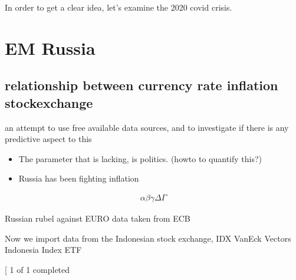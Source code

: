 \documentclass[letterpaper,10pt,english]{sphinxmanual}
\begin{document}
\sphinxAtStartPar
In order to get a clear idea, let’s examine the 2020 covid crisis.


\chapter{EM Russia}
\label{\detokenize{russia:em-russia}}\label{\detokenize{russia::doc}}

\section{relationship between currency rate \sphinxhyphen{} inflation \sphinxhyphen{} stockexchange}
\label{\detokenize{russia:relationship-between-currency-rate-inflation-stockexchange}}
\sphinxAtStartPar
an attempt to use free available data sources, and to investigate if
there is any predictive aspect to this
\begin{itemize}
\item {} 
\sphinxAtStartPar
The parameter that is lacking, is politics. (howto to quantify this?)

\item {} 
\sphinxAtStartPar
Russia has been fighting inflation

\end{itemize}
\begin{equation*}
\begin{split}\alpha\beta\gamma\Delta\Gamma\end{split}
\end{equation*}
\begin{sphinxVerbatim}[commandchars=\\\{\}]
       
\end{sphinxVerbatim}

\sphinxAtStartPar
Russian rubel against EURO \sphinxhyphen{} data taken from ECB

\sphinxAtStartPar
Now we import data from the Indonesian stock exchange, IDX \sphinxhyphen{} VanEck
Vectors Indonesia Index ETF
\begin{sphinxalltt}
{[}\sphinxstylestrong{*******************100\%*********************}{]}  1 of 1 completed
\end{sphinxalltt}

\begin{sphinxVerbatim}[commandchars=\\\{\}]
\end{sphinxVerbatim}
\end{document}
